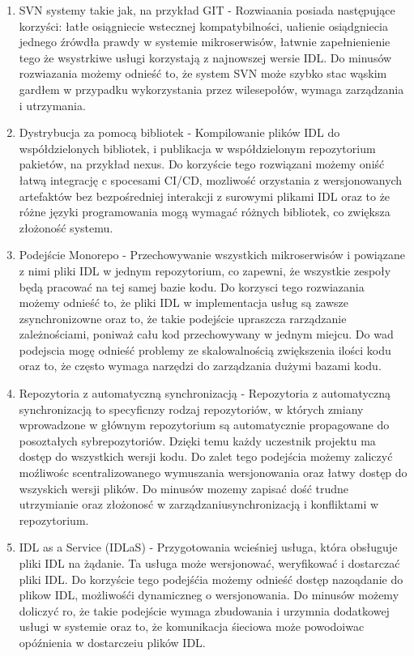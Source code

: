 \documentclass[runningheads,12pt]{llncs}
\begin{document}
\begin{enumerate}
    \item SVN systemy takie jak, na przykład GIT - Rozwiaania posiada następujące korzyści: łatłe osiągniecie wstecznej kompatybilności, uałienie osiądgniecia jednego źrówdła prawdy w systemie mikroserwisów, łatwnie zapełnienienie tego że wsystrkiwe usługi korzystają z najnowszej wersie IDL. Do minusów rozwiazania możemy odnieść to, że system SVN może szybko stac wąskim gardłem w przypadku wykorzystania przez wilesepołów, wymaga zarządzania i utrzymania.
    \item Dystrybucja za pomocą bibliotek - Kompilowanie plików IDL do współdzielonych bibliotek, i publikacja w współdzielonym repozytorium pakietów, na przykład nexus. Do korzyście tego rozwiązani możemy oniść łatwą integrację c spocesami CI/CD, mozliwość orzystania z wersjonowanych artefaktów bez bezpośredniej interakcji z surowymi plikami IDL oraz to że różne języki programowania mogą wymagać różnych bibliotek, co zwiększa złożoność systemu.
    \item Podejście Monorepo - Przechowywanie wszystkich mikroserwisów i powiązane z nimi pliki IDL w jednym repozytorium, co zapewni, że wszystkie zespoły będą pracować na tej samej bazie kodu. Do korzysci tego rozwiazania możemy odnieść to, że pliki IDL w implementacja usług są zawsze zsynchronizowne oraz to, że takie podejście upraszcza rarządzanie zależnościami, poniważ cału kod przechowywany w jednym miejcu. Do wad podejscia mogę odnieść problemy ze skalowalnością zwiększenia ilości kodu oraz to, że często wymaga narzędzi do zarządzania dużymi bazami kodu.
    \item Repozytoria z automatyczną synchronizacją - Repozytoria z automatyczną synchronizacją to specyficnzy rodzaj repozytoriów, w których zmiany wprowadzone w głównym repozytorium są automatycznie propagowane do posoztałych sybrepozytoriów. Dzięki temu każdy uczestnik projektu ma dostęp do wszystkich wersji kodu. Do zalet tego podejścia możemy zaliczyć moźliwośc scentralizowanego wymuszania wersjonowania oraz łatwy dostęp do wszyskich wersji plików. Do minusów mozemy zapisać dość trudne utrzymianie oraz złożonosć w zarządzaniusynchronizacją i konfliktami w repozytorium.
    \item IDL as a Service (IDLaS) - Przygotowania wcieśniej usługa, która obsługuje pliki IDL na żądanie. Ta usługa może wersjonować, weryfikować i dostarczać pliki IDL. Do korzyście tego podejśćia możemy odnieść dostęp nazoądanie do plikow IDL, możliwośći dynamiczneg o wersjonowania. Do minusów możemy doliczyć ro, że takie podejście wymaga zbudowania i urzymnia dodatkowej usługi w systemie oraz to, że komunikacja śieciowa może powodoiwac opóźnienia w dostarczeiu plików IDL.
\end{enumerate}
\end{document}
